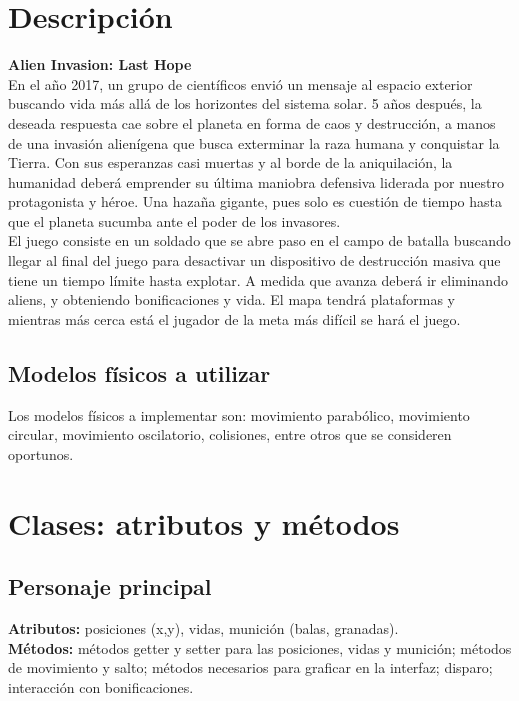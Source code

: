 \documentclass{article}
\begin{document}
\section{Descripción}
\textbf{Alien Invasion: Last Hope}\\

En el año 2017, un grupo de científicos envió un mensaje al espacio exterior buscando vida más allá de los horizontes del sistema solar. 5 años después, la deseada respuesta cae sobre el planeta en forma de caos y destrucción, a manos de una invasión alienígena que busca exterminar la raza humana y conquistar la Tierra. Con sus esperanzas casi muertas y al borde de la aniquilación, la humanidad deberá emprender su última maniobra defensiva liderada por nuestro protagonista y héroe. Una hazaña gigante, pues solo es cuestión de tiempo hasta que el planeta sucumba ante el poder de los invasores.\\

El juego consiste en un soldado que se abre paso en el campo de batalla buscando llegar al final del juego para desactivar un dispositivo de destrucción masiva que tiene un tiempo límite hasta explotar. A medida que avanza deberá ir eliminando aliens, y obteniendo bonificaciones y vida. El mapa tendrá plataformas y mientras más cerca está el jugador de la meta más difícil se hará el juego.

\subsection{Modelos físicos a utilizar}
Los modelos físicos a implementar son: movimiento parabólico, movimiento circular, movimiento oscilatorio, colisiones, entre otros que se consideren oportunos.


\section{Clases: atributos y métodos}

\subsection{Personaje principal}
\noindent\textbf{Atributos:} posiciones (x,y), vidas, munición (balas, granadas).\\
\textbf{Métodos:} métodos getter y setter para las posiciones, vidas y munición; métodos de movimiento y salto; métodos necesarios para graficar en la interfaz; disparo; interacción con bonificaciones.
\end{document}
